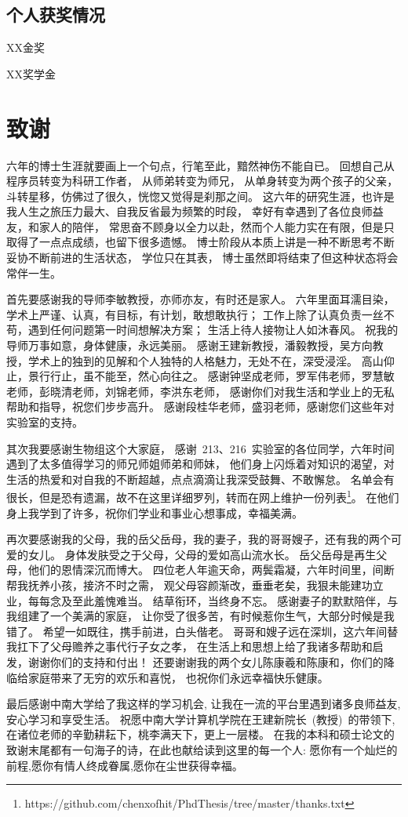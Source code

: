 \subsection*{个人获奖情况}
\noindent
\begin{enumerate}[label={[\arabic*]}]
\item XX金奖
\item XX奖学金
\end{enumerate}
\fi

\newpage

\ifblindreview
\else
\section{致谢} %
六年的博士生涯就要画上一个句点，行笔至此，黯然神伤不能自已。
回想自己从程序员转变为科研工作者，
从师弟转变为师兄，
从单身转变为两个孩子的父亲，
斗转星移，仿佛过了很久，恍惚又觉得是刹那之间。
这六年的研究生涯，也许是我人生之旅压力最大、自我反省最为频繁的时段，
幸好有幸遇到了各位良师益友，和家人的陪伴，
常思奋不顾身以全力以赴，然而个人能力实在有限，但是只取得了一点点成绩，也留下很多遗憾。
博士阶段从本质上讲是一种不断思考不断妥协不断前进的生活状态，
学位只在其表，
博士虽然即将结束了但这种状态将会常伴一生。

首先要感谢我的导师李敏教授，亦师亦友，有时还是家人。
六年里面耳濡目染，学术上严谨、认真，有目标，有计划，敢想敢执行；
工作上除了认真负责一丝不苟，遇到任何问题第一时间想解决方案；
生活上待人接物让人如沐春风。
祝我的导师万事如意，身体健康，永远美丽。
感谢王建新教授，潘毅教授，吴方向教授，学术上的独到的见解和个人独特的人格魅力，无处不在，深受浸淫。
高山仰止，景行行止，虽不能至，然心向往之。
感谢钟坚成老师，罗军伟老师，罗慧敏老师，彭晓清老师，刘锦老师，李洪东老师，
感谢你们对我生活和学业上的无私帮助和指导，祝您们步步高升。
感谢段桂华老师，盛羽老师，感谢您们这些年对实验室的支持。

其次我要感谢生物组这个大家庭，
感谢~213、216~实验室的各位同学，六年时间遇到了太多值得学习的师兄师姐师弟和师妹，
他们身上闪烁着对知识的渴望，对生活的热爱和对自我的不断超越，点点滴滴让我深受鼓舞、不敢懈怠。
名单会有很长，但是恐有遗漏，故不在这里详细罗列，转而在网上维护一份列表\footnote{https://github.com/chenxofhit/PhdThesis/tree/master/thanks.txt}。
在他们身上我学到了许多，祝你们学业和事业心想事成，幸福美满。

再次要感谢我的父母，我的岳父岳母，我的妻子，我的哥哥嫂子，还有我的两个可爱的女儿。
身体发肤受之于父母，父母的爱如高山流水长。
岳父岳母是再生父母，他们的恩情深沉而博大。
四位老人年逾天命，两鬓霜凝，六年时间里，间断帮我抚养小孩，接济不时之需，
观父母容颜渐改，垂垂老矣，我狠未能建功立业，每每念及至此羞愧难当。
结草衔环，当终身不忘。
感谢妻子的默默陪伴，与我组建了一个美满的家庭，
让你受了很多苦，有时候惹你生气，大部分时候是我错了。
希望一如既往，携手前进，白头偕老。
哥哥和嫂子远在深圳，这六年间替我扛下了父母赡养之事代行子女之孝，
在生活上和思想上给了我诸多帮助和启发，谢谢你们的支持和付出！
还要谢谢我的两个女儿陈康羲和陈康和，你们的降临给家庭带来了无穷的欢乐和喜悦，
也祝你们永远幸福快乐健康。

最后感谢中南大学给了我这样的学习机会, 
让我在一流的平台里遇到诸多良师益友,
安心学习和享受生活。
祝愿中南大学计算机学院在王建新院长~(教授)~的带领下, 
在诸位老师的辛勤耕耘下，桃李满天下，更上一层楼。
在我的本科和硕士论文的致谢末尾都有一句海子的诗，在此也献给读到这里的每一个人:
愿你有一个灿烂的前程,愿你有情人终成眷属,愿你在尘世获得幸福。
\newpage
\fi